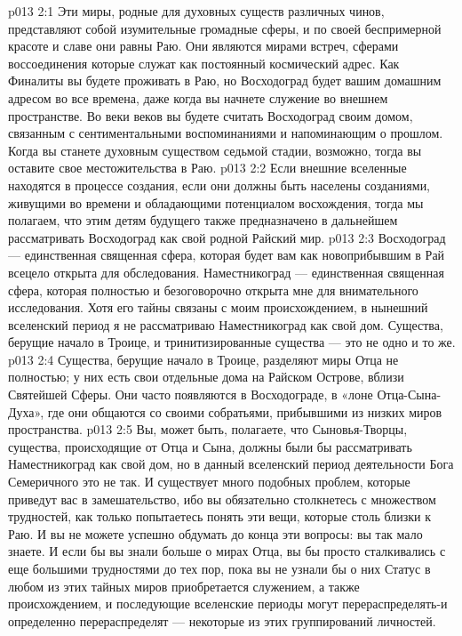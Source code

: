 \vs p013 2:1 Эти миры, родные для духовных существ различных чинов, представляют собой изумительные громадные сферы, и по своей беспримерной красоте и славе они равны Раю. Они являются мирами встреч, сферами воссоединения которые служат как постоянный космический адрес. Как Финалиты вы будете проживать в Раю, но Восходоград будет вашим домашним адресом во все времена, даже когда вы начнете служение во внешнем пространстве. Во веки веков вы будете считать Восходоград своим домом, связанным с сентиментальными воспоминаниями и напоминающим о прошлом. Когда вы станете духовным существом седьмой стадии, возможно, тогда вы оставите свое местожительства в Раю.
\vs p013 2:2 Если внешние вселенные находятся в процессе создания, если они должны быть населены созданиями, живущими во времени и обладающими потенциалом восхождения, тогда мы полагаем, что этим детям будущего также предназначено в дальнейшем рассматривать Восходоград как свой родной Райский мир.
\vs p013 2:3 \pc Восходоград --- единственная священная сфера, которая будет вам как новоприбывшим в Рай всецело открыта для обследования. Наместникоград --- единственная священная сфера, которая полностью и безоговорочно открыта мне для внимательного исследования. Хотя его тайны связаны с моим происхождением, в нынешний вселенский период я не рассматриваю Наместникоград как свой дом. Существа, берущие начало в Троице, и тринитизированные существа --- это не одно и то же.
\vs p013 2:4 \pc Существа, берущие начало в Троице, разделяют миры Отца не полностью; у них есть свои отдельные дома на Райском Острове, вблизи Святейшей Сферы. Они часто появляются в Восходограде, в «лоне Отца\hyp{}Сына\hyp{}Духа», где они общаются со своими собратьями, прибывшими из низких миров пространства.
\vs p013 2:5 \pc Вы, может быть, полагаете, что Сыновья\hyp{}Творцы, существа, происходящие от Отца и Сына, должны были бы рассматривать Наместникоград как свой дом, но в данный вселенский период деятельности Бога Семеричного это не так. И существует много подобных проблем, которые приведут вас в замешательство, ибо вы обязательно столкнетесь с множеством трудностей, как только попытаетесь понять эти вещи, которые столь близки к Раю. И вы не можете успешно обдумать до конца эти вопросы: вы так мало знаете. И если бы вы знали больше о мирах Отца, вы бы просто сталкивались с еще большими трудностями до тех пор, пока вы не узнали бы о них  Статус в любом из этих тайных миров приобретается служением, а также происхождением, и последующие вселенские периоды могут перераспределять\hyp{}и определенно перераспределят --- некоторые из этих группирований личностей.
